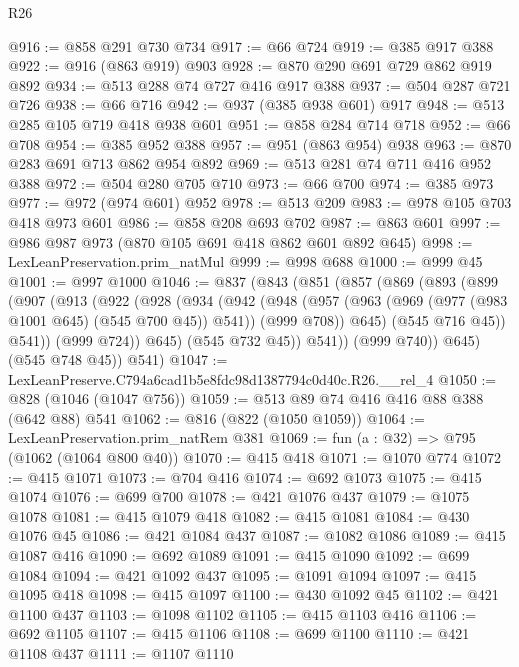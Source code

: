 \begin{lexlean}{R26}
\begin{coremodule}
@916 := @858 @291 @730 @734
@917 := @66 @724
@919 := @385 @917 @388
@922 := @916 (@863 @919) @903
@928 := @870 @290 @691 @729 @862 @919 @892
@934 := @513 @288 @74 @727 @416 @917 @388
@937 := @504 @287 @721 @726
@938 := @66 @716
@942 := @937 (@385 @938 @601) @917
@948 := @513 @285 @105 @719 @418 @938 @601
@951 := @858 @284 @714 @718
@952 := @66 @708
@954 := @385 @952 @388
@957 := @951 (@863 @954) @938
@963 := @870 @283 @691 @713 @862 @954 @892
@969 := @513 @281 @74 @711 @416 @952 @388
@972 := @504 @280 @705 @710
@973 := @66 @700
@974 := @385 @973
@977 := @972 (@974 @601) @952
@978 := @513 @209
@983 := @978 @105 @703 @418 @973 @601
@986 := @858 @208 @693 @702
@987 := @863 @601
@997 := @986 @987 @973 (@870 @105 @691 @418 @862 @601 @892 @645)
@998 := LexLeanPreservation.prim_natMul
@999 := @998 @688
@1000 := @999 @45
@1001 := @997 @1000
@1046 := @837
    (@843
      (@851
        (@857
          (@869
            (@893
              (@899
                (@907
                  (@913
                    (@922
                      (@928
                        (@934
                          (@942
                            (@948
                              (@957
                                (@963 (@969 (@977 (@983 @1001 @645) (@545 @700 @45)) @541))
                                (@999 @708))
                              @645)
                            (@545 @716 @45))
                          @541))
                      (@999 @724))
                    @645)
                  (@545 @732 @45))
                @541))
            (@999 @740))
          @645)
        (@545 @748 @45))
      @541)
@1047 := LexLeanPreserve.C794a6cad1b5e8fdc98d1387794c0d40c.R26.__rel_4
@1050 := @828 (@1046 (@1047 @756))
@1059 := @513 @89 @74 @416 @416 @88 @388 (@642 @88) @541
@1062 := @816 (@822 (@1050 @1059))
@1064 := LexLeanPreservation.prim_natRem @381
@1069 := fun (a : @32) => @795 (@1062 (@1064 @800 @40))
@1070 := @415 @418
@1071 := @1070 @774
@1072 := @415 @1071
@1073 := @704 @416
@1074 := @692 @1073
@1075 := @415 @1074
@1076 := @699 @700
@1078 := @421 @1076 @437
@1079 := @1075 @1078
@1081 := @415 @1079 @418
@1082 := @415 @1081
@1084 := @430 @1076 @45
@1086 := @421 @1084 @437
@1087 := @1082 @1086
@1089 := @415 @1087 @416
@1090 := @692 @1089
@1091 := @415 @1090
@1092 := @699 @1084
@1094 := @421 @1092 @437
@1095 := @1091 @1094
@1097 := @415 @1095 @418
@1098 := @415 @1097
@1100 := @430 @1092 @45
@1102 := @421 @1100 @437
@1103 := @1098 @1102
@1105 := @415 @1103 @416
@1106 := @692 @1105
@1107 := @415 @1106
@1108 := @699 @1100
@1110 := @421 @1108 @437
@1111 := @1107 @1110

\end{coremodule}
\end{lexlean}
